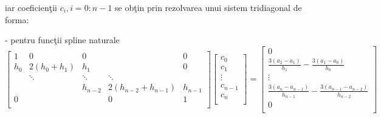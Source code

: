 \documentclass{exam}
\begin{document}
\noindent iar coeficienţii $c_i, i = 0:n-1$ se obţin prin rezolvarea unui sistem tridiagonal de forma:

- pentru funcţii spline naturale
\begin{equation*}
	\begin{bmatrix}
		{1}   & {0}          & {0}       & {   }                & { 0 }     \\
		{h_0} & {2(h_0+h_1)} & {h_1}     & {   }                & {0 }      \\
		{   } & \ddots       & \ddots    & \ddots               & { }       \\
		{   } & { }          & {h_{n-2}} & {2(h_{n-2}+h_{n-1})} & {h_{n-1}} \\
		{ 0 } & {   }        & { }       & {0}                  & {1}       \\
	\end{bmatrix}
	\begin{bmatrix}
		{c_0 }     \\
		{c_1 }     \\
		\vdots     \\
		{c_{n-1} } \\
		{c_n }     \\
	\end{bmatrix}
	=
	\begin{bmatrix}
		{0}                                                                     \\
		\frac {3(a_2-a_1)}{h_1} - \frac {3(a_1-a_0)}{h_0}                       \\
		\vdots                                                                  \\
		\frac {3(a_{n}-a_{n-1})}{h_{n-1}} - \frac {3(a_{n-1}-a_{n-2})}{h_{n-2}} \\
		{0}                                                                     \\
	\end{bmatrix}
\end{equation*}
\end{document}
